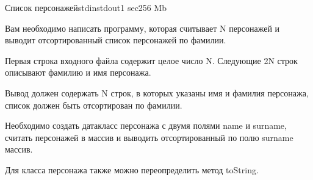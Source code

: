 \begin{problem}{Список персонажей}{stdin}{stdout}{1 sec}{256 Mb}

Вам необходимо написать программу, которая считывает N персонажей и выводит отсортированный список персонажей по фамилии.

\InputFile

Первая строка входного файла содержит целое число N. Следующие 2N строк описывают фамилию и имя персонажа.

\OutputFile

Вывод должен содержать N строк, в которых указаны имя и фамилия персонажа, список должен быть отсортирован по фамилии.
\Example

\begin{example}
%
\end{example}

\Note

Необходимо создать датакласс персонажа с двумя полями name и surname, 
считать персонажей в массив и выводить отсортированный по полю surname массив.

Для класса персонажа также можно переопределить метод toString.

\end{problem}